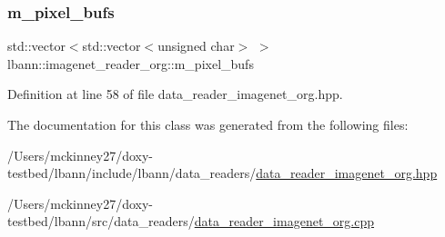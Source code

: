 \subsubsection{\texorpdfstring{m\+\_\+pixel\+\_\+bufs}{m\_pixel\_bufs}}
{\footnotesize\ttfamily std\+::vector$<$std\+::vector$<$unsigned char$>$ $>$ lbann\+::imagenet\+\_\+reader\+\_\+org\+::m\+\_\+pixel\+\_\+bufs\hspace{0.3cm}{\ttfamily [protected]}}



Definition at line 58 of file data\+\_\+reader\+\_\+imagenet\+\_\+org.\+hpp.



The documentation for this class was generated from the following files\+:\begin{DoxyCompactItemize}
\item 
/\+Users/mckinney27/doxy-\/testbed/lbann/include/lbann/data\+\_\+readers/\hyperlink{data__reader__imagenet__org_8hpp}{data\+\_\+reader\+\_\+imagenet\+\_\+org.\+hpp}\item 
/\+Users/mckinney27/doxy-\/testbed/lbann/src/data\+\_\+readers/\hyperlink{data__reader__imagenet__org_8cpp}{data\+\_\+reader\+\_\+imagenet\+\_\+org.\+cpp}\end{DoxyCompactItemize}
